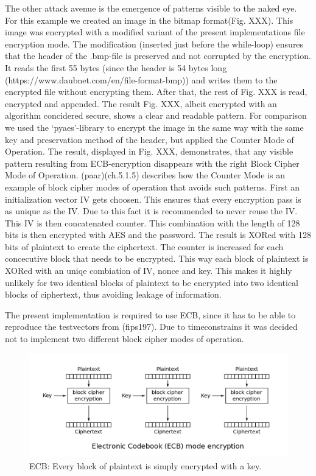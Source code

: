 The other
attack avenue is the emergence of patterns visible to the naked eye. For
this example we created an image in the bitmap format(Fig. XXX). This
image was encrypted with a modified variant of the present
implementations file encryption mode. The modification (inserted just
before the while-loop) ensures that the header of the .bmp-file is
preserved and not corrupted by the encryption. It reads the first 55
bytes (since the header is 54 bytes long
(https://www.daubnet.com/en/file-format-bmp)) and writes them to the
encrypted file without encrypting them. After that, the rest of Fig. XXX
is read, encrypted and appended. The result Fig. XXX, albeit encrypted
with an algorithm concidered secure, shows a clear and readable pattern.
For comparison we used the `pyaes'-library to encrypt the image in the
same way with the same key and preservation method of the header, but
applied the Counter Mode of Operation. The result, displayed in Fig.
XXX, demonstrates, that any visible pattern resulting from
ECB-encryption disappears with the right Block Cipher Mode of Operation.
(paar)(ch.5.1.5) describes how the Counter Mode is an example of block
cipher modes of operation that avoids such patterns. First an
initialization vector IV gets choosen. This ensures that every
encryption pass is as unique as the IV. Due to this fact it is
recommended to never reuse the IV. This IV is then concatenated counter.
This combination with the length of 128 bits is then encrypted with AES
and the password. The result is XORed with 128 bits of plaintext to
create the ciphertext. The counter is increased for each concecutive
block that needs to be encrypted. This way each block of plaintext is
XORed with an uniqe combiation of IV, nonce and key. This makes it
highly unlikely for two identical blocks of plaintext to be encrypted
into two identical blocks of ciphertext, thus avoiding leakage of
information.

The present implementation is required to use ECB, since it has to be
able to reproduce the testvectors from (fips197). Due to timeconstrains
it was decided not to implement two different block cipher modes of
operation.

\begin{figure}
\centering
\includegraphics[scale = 0.3]{data/figures/ECB_encryption.png}
\caption{ECB: Every block of plaintext is simply encrypted with a key.}
\end{figure}

